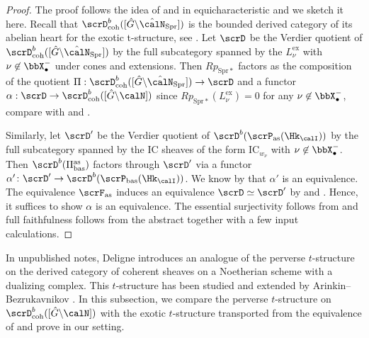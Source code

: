 \documentclass[10pt, reqno]{amsart}
\theoremstyle{plain}
\theoremstyle{definition}
\numberwithin{equation}{section}
\begin{document}
\begin{proof}
	The proof follows the idea of \cite[Theorem 1]{Bez09} and \cite[Theorem 7.3.1]{AR} in equicharacteristic and we sketch it here. Recall that $\scrD^b_\mathrm{coh}([\hat{G}\backslash\hat{\calN}_{\mathrm{Spr}}])$ is the bounded derived category of its abelian heart for the exotic t-structure, see . Let $\scrD$ be the Verdier quotient of $\scrD_\mathrm{coh}^b([\hat{G}\backslash\hat{\calN}_{\mathrm{Spr}}])$ by the full subcategory spanned by the $L_\nu^\mathrm{ex}$ with $\nu\not\in \bbX_{\bullet}^-$ under cones and extensions. Then $Rp_{\mathrm{Spr}*}$ factors as the composition of the quotient  $\Pi:\scrD^b_\mathrm{coh}([\hat{G}\backslash\hat{\calN}_{\mathrm{Spr}}])\rightarrow\scrD$ and a functor $\alpha:\scrD\rightarrow \scrD^b_\mathrm{coh}([\hat{G}\backslash{\calN}])$ since $Rp_{\mathrm{Spr*}}(L^\mathrm{ex}_\nu)=0$ for any $\nu\not\in \bbX_\bullet^-$, compare with \cite[Lemma 1]{Bez09} and \cite[Lemma 7.3.3]{AR}. 
	
	Similarly, let $\scrD'$ be the Verdier quotient of $\scrD^b(\scrP_\mathrm{as}(\Hk_{\calI}))$ by the full subcategory spanned by the IC sheaves of the form $\mathrm{IC}_{w_\nu}$ with $\nu \not\in \bbX_{\bullet}^-$. Then $\scrD^b(\Pi^{\mathrm{as}}_{\mathrm{bas}})$ factors through $\scrD'$ via a functor $\alpha' \colon \scrD'\to \scrD^b(\scrP_{\mathrm{bas}}(\Hk_{\calI}))$. We know by \cite[Theorem 3.2]{Miy91} that $\alpha'$ is an equivalence.  The equivalence $\scrF_\mathrm{as}$ induces an equivalence $\scrD\simeq \scrD'$ by   and . Hence, it suffices to show $\alpha$ is an equivalence. The essential surjectivity follows from \cite[Lemma 7]{Bez03}  %
	and full faithfulness follows from the abstract \cite[Lemma 7.3.13]{AR} together with a few input calculations.
\end{proof}

In unpublished notes, Deligne introduces an analogue of the perverse $t$-structure \cite{BBDG18} on the derived category of coherent sheaves on a Noetherian scheme with a dualizing complex. This $t$-structure has been studied and extended by Arinkin--Bezrukavnikov \cite{AB10}. In this subsection, we compare the perverse $t$-structure on $\scrD^b_\mathrm{coh}([\hat{G}\backslash\calN])$ with the exotic $t$-structure transported from the equivalence of  and prove \cite[Theorem 2, Corollary 1]{Bez09} in our setting.
\end{document}
